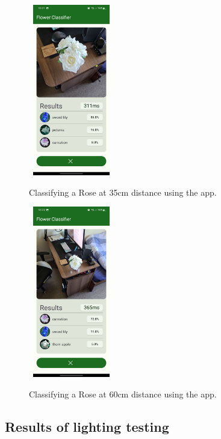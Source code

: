 \documentclass[12pt,a4paper]{report}
\begin{document}
\begin{figure}[h]\
    \includegraphics[width=0.3\textwidth]{rose_35cm.jpg}
    \caption{Classifying a Rose at 35cm distance using the app.}
    \label{fig:rose_35}
\end{figure}

\begin{figure}[h]\
    \includegraphics[width=0.3\textwidth]{rose_60cm.jpg}
    \caption{Classifying a Rose at 60cm distance using the app.}
    \label{fig:rose_60}
\end{figure}

\clearpage

\subsection{Results of lighting testing}
\label{subsec:lighting}
\end{document}
